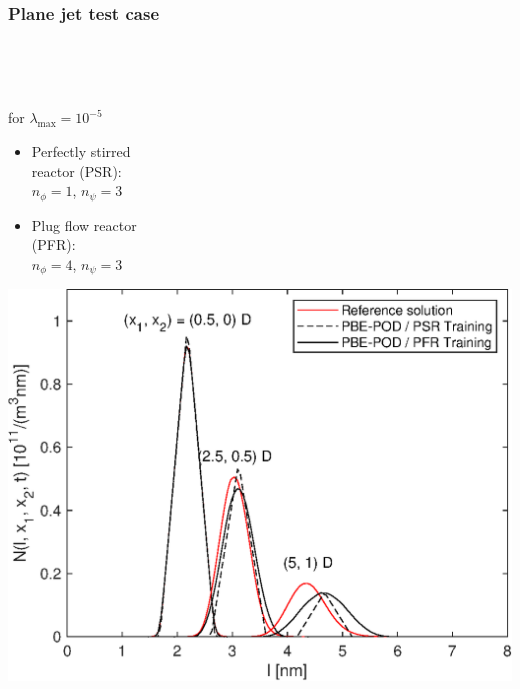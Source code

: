 \documentclass[10pt,xcolor=dvipsnames]{beamer}
\newcommand*{\itemskip}{0.25\baselineskip}
\begin{document}
\begin{frame}[t]

  \frametitle{Plane jet test case}

  \vspace{-0.5\baselineskip}
  \begin{minipage}[t]{0.7\columnwidth}\vskip0pt
  \resizebox{\columnwidth}{!}{}\\
  \end{minipage}\hfill
  \begin{minipage}[t]{0.29\columnwidth}\vskip0pt
  \hfill{}\\
  \end{minipage}

  \begin{minipage}[t]{0.36\columnwidth}\vskip0pt
  \justifying{} for $\lambda_{\max} = 10^{-5}$\\
  \begin{itemize}
  \vspace{\itemskip}
  \item Perfectly stirred\\reactor (PSR):\\$n_\phi = 1$, $n_\psi = 3$
  \vspace{\itemskip}
  \item Plug flow reactor\\(PFR):\\$n_\phi = 4$, $n_\psi = 3$
  \end{itemize}
  \end{minipage}\hfill
  \begin{minipage}[t]{0.57\columnwidth}\vskip0pt
  \hfill\includegraphics[width=\columnwidth,clip]{fig/planejet_psds_xr.eps}
  \end{minipage}

\end{frame}
\end{document}
